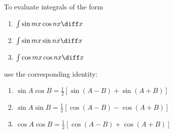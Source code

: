 \begin{frame}
To evaluate integrals of the form
\begin{enumerate}
\item  $\int \sin mx \cos nx \diff x$
\item  $\int \sin mx \sin nx \diff x$
\item  $\int \cos mx \cos nx \diff x$
\end{enumerate}
use the corresponding identity:
\begin{enumerate}
\item  $\sin A \cos B = \frac{1}{2}[\sin (A-B) + \sin (A+B)]$
\item  $\sin A \sin B = \frac{1}{2}[\cos (A-B) - \cos (A+B)]$
\item  $\cos A \cos B = \frac{1}{2}[\cos (A-B) + \cos (A+B)]$
\end{enumerate}
\end{frame}
